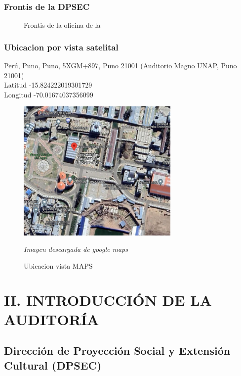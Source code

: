 \documentclass[12pt,a4paper]{article}
\begin{document}
\newpage
\subsubsection*{Frontis de la DPSEC}
\begin{figure}[!htb]
    \centering
    \caption{Frontis de la oficina de la \dpsec}
\end{figure}

\newpage
\subsubsection*{Ubicacion por vista satelital}
Perú, Puno, Puno, 5XGM+897, Puno 21001 (Auditorio Magno UNAP, Puno 21001)
\\
Latitud -15.824222019301729 \\
Longitud -70.01674037356099



\begin{figure}[!htb]
    \centering
    \includegraphics[width=0.7\textwidth]{images/ubicacion.png}
    \caption{Ubicacion vista MAPS } \par \textit{Imagen descargada de google maps}

\end{figure}


\newpage
\section{II. INTRODUCCIÓN DE LA AUDITORÍA}
\subsection*{Dirección de Proyección Social y Extensión Cultural (DPSEC)}
\end{document}
